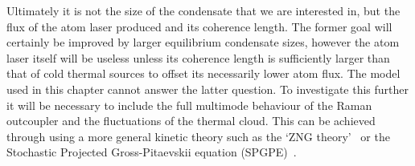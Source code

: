 Ultimately it is not the size of the condensate that we are interested in, but the flux of the atom laser produced and its coherence length.  The former goal will certainly be improved by larger equilibrium condensate sizes, however the atom laser itself will be useless unless its coherence length is sufficiently larger than that of cold thermal sources to offset its necessarily lower atom flux.  The model used in this chapter cannot answer the latter question.  To investigate this further it will be necessary to include the full multimode behaviour of the Raman outcoupler and the fluctuations of the thermal cloud.  This can be achieved through using a more general kinetic theory such as the `ZNG theory'~\citep{Zaremba:1999,Proukakis:2008} or the Stochastic Projected Gross-Pitaevskii equation (SPGPE)~\citep{Blakie:2008a}.




